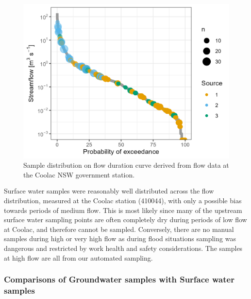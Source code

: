\documentclass[, manuscript]{copernicus}
\begin{document}
\begin{figure}
\includegraphics[width=0.8\linewidth]{Figures/FDC} \caption{Sample distribution on flow duration curve derived from flow data at the Coolac NSW government station.}\label{fig:FDC}
\end{figure}

Surface water samples were reasonably well distributed across the flow
distribution, measured at the Coolac station (410044), with only a
possible bias towards periods of medium flow. This is most likely since
many of the upstream surface water sampling points are often completely
dry during periods of low flow at Coolac, and therefore cannot be
sampled. Conversely, there are no manual samples during high or very
high flow as during flood situations sampling was dangerous and
restricted by work health and safety considerations. The samples at high
flow are all from our automated sampling.

\subsubsection{Comparisons of Groundwater samples with Surface water
samples}
\end{document}
